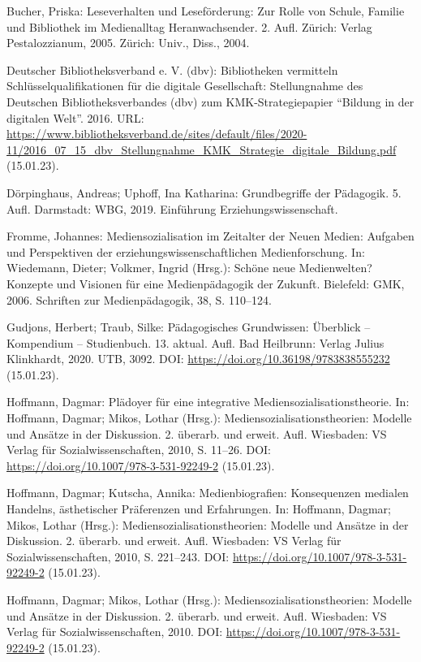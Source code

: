 \documentclass[a4paper,
fontsize=11pt,
oneside,
numbers=noperiodatend,
parskip=half-,
bibliography=totoc,
final
]{scrartcl}
\begin{document}
Bucher, Priska: Leseverhalten und Leseförderung: Zur Rolle von Schule,
Familie und Bibliothek im Medienalltag Heranwachsender. 2. Aufl. Zürich:
Verlag Pestalozzianum, 2005. Zürich: Univ., Diss., 2004.

Deutscher Bibliotheksverband e. V. (dbv): Bibliotheken vermitteln
Schlüsselqualifikationen für die digitale Gesellschaft: Stellungnahme
des Deutschen Bibliotheksverbandes (dbv) zum KMK-Strategiepapier
\enquote{Bildung in der digitalen Welt}. 2016. URL:
\url{https://www.bibliotheksverband.de/sites/default/files/2020-11/2016_07_15_dbv_Stellungnahme_KMK_Strategie_digitale_Bildung.pdf}
(15.01.23).

Dörpinghaus, Andreas; Uphoff, Ina Katharina: Grundbegriffe der
Pädagogik. 5. Aufl. Darmstadt: WBG, 2019. Einführung
Erziehungswissenschaft.

Fromme, Johannes: Mediensozialisation im Zeitalter der Neuen Medien:
Aufgaben und Perspektiven der erziehungswissenschaftlichen
Medienforschung. In: Wiedemann, Dieter; Volkmer, Ingrid (Hrsg.): Schöne
neue Medienwelten? Konzepte und Visionen für eine Medienpädagogik der
Zukunft. Bielefeld: GMK, 2006. Schriften zur Medienpädagogik, 38, S.
110--124.

Gudjons, Herbert; Traub, Silke: Pädagogisches Grundwissen: Überblick --
Kompendium -- Studienbuch. 13. aktual. Aufl. Bad Heilbrunn: Verlag
Julius Klinkhardt, 2020. UTB, 3092. DOI:
\url{https://doi.org/10.36198/9783838555232} (15.01.23).

Hoffmann, Dagmar: Plädoyer für eine integrative
Mediensozialisationstheorie. In: Hoffmann, Dagmar; Mikos, Lothar
(Hrsg.): Mediensozialisationstheorien: Modelle und Ansätze in der
Diskussion. 2. überarb. und erweit. Aufl. Wiesbaden: VS Verlag für
Sozialwissenschaften, 2010, S. 11--26. DOI:
\url{https://doi.org/10.1007/978-3-531-92249-2} (15.01.23).

Hoffmann, Dagmar; Kutscha, Annika: Medienbiografien: Konsequenzen
medialen Handelns, ästhetischer Präferenzen und Erfahrungen. In:
Hoffmann, Dagmar; Mikos, Lothar (Hrsg.): Mediensozialisationstheorien:
Modelle und Ansätze in der Diskussion. 2. überarb. und erweit. Aufl.
Wiesbaden: VS Verlag für Sozialwissenschaften, 2010, S. 221--243. DOI:
\url{https://doi.org/10.1007/978-3-531-92249-2} (15.01.23).

Hoffmann, Dagmar; Mikos, Lothar (Hrsg.): Mediensozialisationstheorien:
Modelle und Ansätze in der Diskussion. 2. überarb. und erweit. Aufl.
Wiesbaden: VS Verlag für Sozialwissenschaften, 2010. DOI:
\url{https://doi.org/10.1007/978-3-531-92249-2} (15.01.23).
\end{document}

